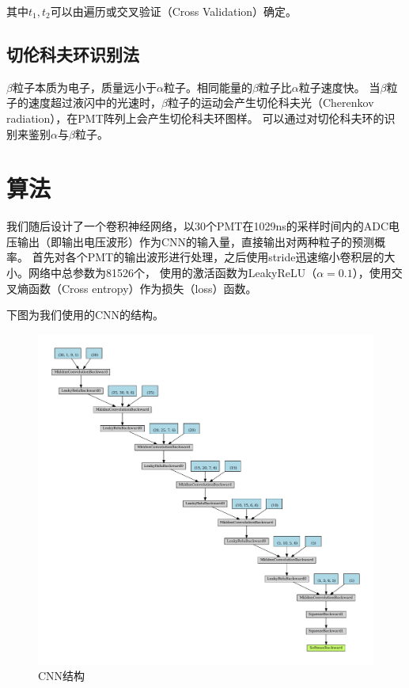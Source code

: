 \documentclass{ctexart}
\begin{document}
其中$t_{1},t_{2}$可以由遍历或交叉验证（Cross Validation）确定。

\subsection{切伦科夫环识别法}
$\beta$粒子本质为电子，质量远小于$\alpha$粒子。相同能量的$\beta$粒子比$\alpha$粒子速度快。
当$\beta$粒子的速度超过液闪中的光速时，$\beta$粒子的运动会产生切伦科夫光（Cherenkov radiation），在PMT阵列上会产生切伦科夫环图样。
可以通过对切伦科夫环的识别来鉴别$\alpha$与$\beta$粒子。

\section{算法}
我们随后设计了一个卷积神经网络，以30个PMT在1029ns的采样时间内的ADC电压输出（即输出电压波形）作为CNN的输入量，直接输出对两种粒子的预测概率。
首先对各个PMT的输出波形进行处理，之后使用stride迅速缩小卷积层的大小。网络中总参数为81526个，
使用的激活函数为LeakyReLU（$\alpha=0.1$），使用交叉熵函数（Cross entropy）作为损失（loss）函数。


下图为我们使用的CNN的结构。

\begin{figure}[H]
    \centering
    \includegraphics[width=1.0\linewidth]{net.pdf}
    \caption{CNN结构}
\end{figure}
\end{document}
